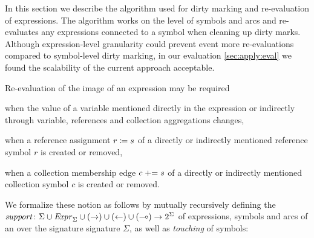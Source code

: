 In this section we describe the algorithm used for dirty marking and re-evaluation of expressions. The algorithm works on the level of symbols and arcs and re-evaluates any expressions connected to a symbol when cleaning up dirty marks. Although expression-level granularity could prevent event more re-evaluations compared to symbol-level dirty marking, in our evaluation \vref{sec:apply:eval} we found the scalability of the current approach acceptable.

Re-evaluation of the image of an expression may be required
\begin{itemize*}
\item when the value of a variable mentioned directly in the expression or indirectly through variable, references and collection aggregations changes,
\item when a reference assignment \(r \coloneq s\) of a directly or indirectly mentioned reference symbol \(r\) is created or removed,
\item when a collection membership edge \(c \mathrel{{+}{=}} s\) of a directly or indirectly mentioned collection symbol \(c\) is created or removed.
\end{itemize*}

We formalize these notion as follows by mutually recursively defining the \(\textrm{\itshape support\/}\colon \Sigma \cup \textrm{\itshape Expr\/}_\Sigma \cup ({\rightarrow}) \cup ({\leftarrow}) \cup ({\multimap}) \to 2^\Sigma\) of expressions, symbols and arcs of an  over the signature signature \(\Sigma\), as well as \emph{touching} of symbols:

